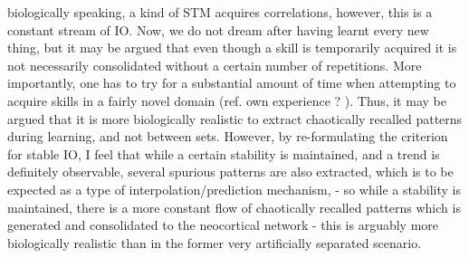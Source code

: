 biologically speaking, a kind of STM acquires correlations, however, this is a constant stream of IO. Now, we do not dream after having learnt every new thing, but it may be argued that even though a skill is temporarily acquired it is not necessarily consolidated without a certain number of repetitions. More importantly, one has to try for a substantial amount of time when attempting to acquire skills in a fairly novel domain (ref. own experience ? ). Thus, it may be argued that it is more biologically realistic to extract chaotically recalled patterns during learning, and not between sets. However, by re-formulating the criterion for stable IO, I feel that while a certain stability is maintained, and a trend is definitely observable, several spurious patterns are also extracted, which is to be expected as a type of interpolation/prediction mechanism, - so while a stability is maintained, there is a more constant flow of chaotically recalled patterns which is generated and consolidated to the neocortical network - this is arguably more biologically realistic than in the former very artificially separated scenario.







\cleardoublepage